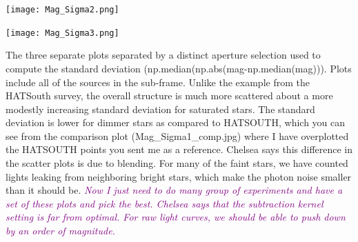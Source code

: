 \begin{center}
\texttt{[image: Mag\_Sigma2.png]}\\ 
\end{center}
\begin{center}
\texttt{[image: Mag\_Sigma3.png]}\\ 
\end{center}
The three separate plots separated by a distinct aperture selection used to compute the standard deviation (np.median(np.abs(mag-np.median(mag))). Plots include all of the sources in the sub-frame. 
Unlike the example from the HATSouth survey, the overall structure is much more scattered about a more modestly increasing standard deviation for saturated stars. The standard deviation is lower for dimmer stars as compared to HATSOUTH, which you can see from the comparison plot (Mag\_Sigma1\_comp.jpg) where I have overplotted the HATSOUTH points you sent me as a reference. 
Chelsea says this difference in the scatter plots is due to blending. For many of the faint stars, we have counted lights leaking from neighboring bright stars, which make the photon noise smaller than it should be. 
\textcolor{purple}{\textit{Now I just need to do many group of experiments and have a set of these plots and pick the best. 
Chelsea says that the subtraction kernel setting is far from optimal. For raw light curves, we should be able to push down by an order of magnitude.}}

\pagebreak

